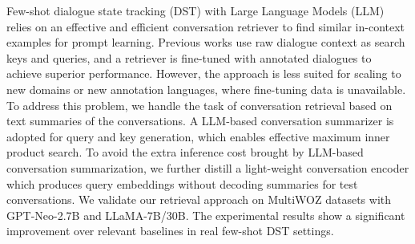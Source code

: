 Few-shot dialogue state tracking (DST) with Large Language Models (LLM) relies on an effective and efficient conversation retriever to find similar in-context examples for prompt learning. Previous works use raw dialogue context as search keys and queries, and a retriever is fine-tuned with annotated dialogues to achieve superior performance. However, the approach is less suited for scaling to new domains or new annotation languages, where fine-tuning data is unavailable. To address this problem, we handle the task of conversation retrieval based on text summaries of the conversations. A LLM-based conversation summarizer is adopted for query and key generation, which enables effective maximum inner product search. To avoid the extra inference cost brought by LLM-based conversation summarization, we further distill a light-weight conversation encoder which produces query embeddings without  decoding summaries for test conversations.  We validate our retrieval approach on MultiWOZ datasets with GPT-Neo-2.7B and LLaMA-7B/30B. The experimental results show a significant improvement over relevant baselines in real few-shot DST settings.